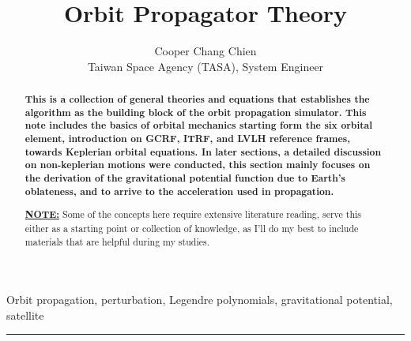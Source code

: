\documentclass[conference,letterpaper,onecolumn]{IEEEtran}
\title{\LARGE \bf Orbit Propagator Theory}
\author{Cooper Chang Chien\\Taiwan Space Agency (TASA), System Engineer}
\begin{document}
\maketitle
\pagestyle{headings}

\begin{abstract}
    \noindent\bfseries
    This is a collection of general theories and equations that establishes the algorithm as the building block of the orbit propagation simulator. This note includes the basics of orbital mechanics starting form the six orbital element, introduction on GCRF, ITRF, and LVLH reference frames, towards Keplerian orbital equations. In later sections, a detailed discussion on non-keplerian motions were conducted, this section mainly focuses on the derivation of the gravitational potential function due to Earth's oblateness, and to arrive to the acceleration used in propagation.\par\vspace{0.5cm}

    \noindent
    \underline{\textbf{NOTE:}} Some of the concepts here require extensive literature reading, serve this either as a starting point or collection of knowledge, as I'll do my best to include materials that are helpful during my studies. 
\end{abstract}

\begin{keywords}
    \centering\small
    Orbit propagation, perturbation, Legendre polynomials, gravitational potential, satellite
\end{keywords}
\vspace{0.2cm}
\hrule





\newpage






\newpage
\end{document}
